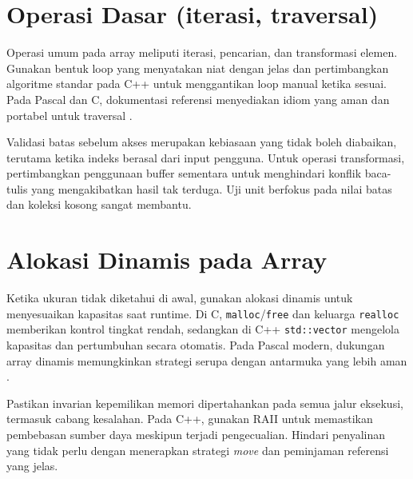 \documentclass[../main.tex]{subfiles}
\begin{document}
\section{Operasi Dasar (iterasi, traversal)}
Operasi umum pada array meliputi iterasi, pencarian, dan transformasi elemen. Gunakan bentuk loop yang menyatakan niat dengan jelas dan pertimbangkan algoritme standar pada C++ untuk menggantikan loop manual ketika sesuai. Pada Pascal dan C, dokumentasi referensi menyediakan idiom yang aman dan portabel untuk traversal \parencite{free-pascal-docs,gnu-c-manual}.

Validasi batas sebelum akses merupakan kebiasaan yang tidak boleh diabaikan, terutama ketika indeks berasal dari input pengguna. Untuk operasi transformasi, pertimbangkan penggunaan buffer sementara untuk menghindari konflik baca-tulis yang mengakibatkan hasil tak terduga. Uji unit berfokus pada nilai batas dan koleksi kosong sangat membantu.

\section{Alokasi Dinamis pada Array}
Ketika ukuran tidak diketahui di awal, gunakan alokasi dinamis untuk menyesuaikan kapasitas saat runtime. Di C, \texttt{malloc}/\texttt{free} dan keluarga \texttt{realloc} memberikan kontrol tingkat rendah, sedangkan di C++ \texttt{std::vector} mengelola kapasitas dan pertumbuhan secara otomatis. Pada Pascal modern, dukungan array dinamis memungkinkan strategi serupa dengan antarmuka yang lebih aman \parencite{iso-c-draft-n1570,cpp-reference,free-pascal-docs}.

Pastikan invarian kepemilikan memori dipertahankan pada semua jalur eksekusi, termasuk cabang kesalahan. Pada C++, gunakan RAII untuk memastikan pembebasan sumber daya meskipun terjadi pengecualian. Hindari penyalinan yang tidak perlu dengan menerapkan strategi \emph{move} dan peminjaman referensi yang jelas.
\end{document}
